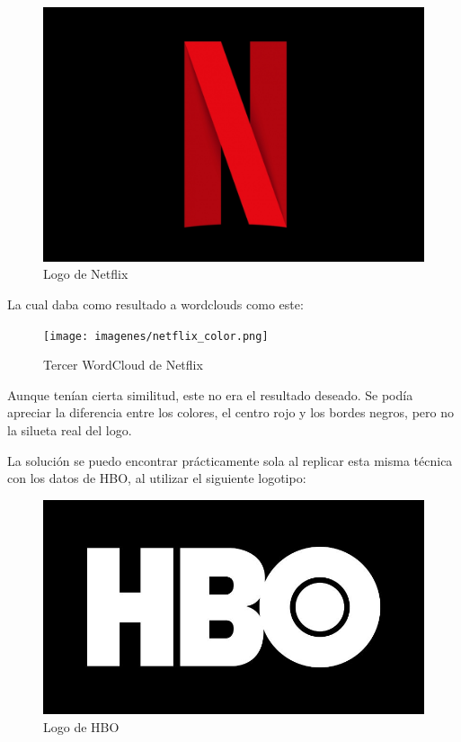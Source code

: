 \begin{figure}[H]
	\centering
	\includegraphics[scale=.2]{imagenes/netflix.jpg}
	\caption{Logo de Netflix}
	\label{fig:logonetflix}
\end{figure} 

La cual daba como resultado a wordclouds como este: 

\begin{figure}[H]
	\centering
	\texttt{[image: imagenes/netflix\_color.png]}
	\caption{Tercer WordCloud de Netflix}
	\label{fig:wordcloudNetflix3}
\end{figure} 

Aunque tenían cierta similitud, este no era el resultado deseado. Se podía apreciar la diferencia entre los colores, el centro rojo y los bordes negros, pero no la silueta real del logo. 

La solución se puedo encontrar prácticamente sola al replicar esta misma técnica con los datos de HBO, al utilizar el siguiente logotipo: 



\begin{figure}[H]
	\centering
	\includegraphics[scale=.35]{imagenes/logohbo.jpg}
	\caption{Logo de HBO}
	\label{fig:logohbo}
\end{figure} 

